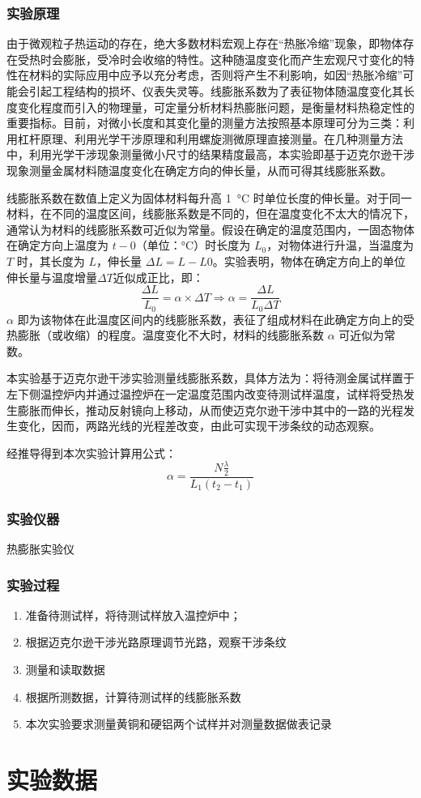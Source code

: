 \documentclass[a4paper,utf8]{article}
\begin{document}
\section{实验原理}%
    由于微观粒子热运动的存在，绝大多数材料宏观上存在“热胀冷缩”现象，即物体存在受热时会膨胀，受冷时会收缩的特性。这种随温度变化而产生宏观尺寸变化的特性在材料的实际应用中应予以充分考虑，否则将产生不利影响，如因“热胀冷缩”可能会引起工程结构的损坏、仪表失灵等。线膨胀系数为了表征物体随温度变化其长度变化程度而引入的物理量，可定量分析材料热膨胀问题，是衡量材料热稳定性的重要指标。目前，对微小长度和其变化量的测量方法按照基本原理可分为三类：利用杠杆原理、利用光学干涉原理和利用螺旋测微原理直接测量。在几种测量方法中，利用光学干涉现象测量微小尺寸的结果精度最高，本实验即基于迈克尔逊干涉现象测量金属材料随温度变化在确定方向的伸长量，从而可得其线膨胀系数。\par
    线膨胀系数在数值上定义为固体材料每升高 \SI{1}{\degreeCelsius} 时单位长度的伸长量。对于同一材料，在不同的温度区间，线膨胀系数是不同的，但在温度变化不太大的情况下，通常认为材料的线膨胀系数可近似为常量。假设在确定的温度范围内，一固态物体在确定方向上温度为 $t-0$（单位：\unit{\degreeCelsius}）时长度为 $L_0$，对物体进行升温，当温度为 $T$ 时，其长度为 $L$，伸长量 $\varDelta L=L-L0$。实验表明，物体在确定方向上的单位伸长量与温度增量$\varDelta T$近似成正比，即：
    \begin{equation}
        \frac{\varDelta L}{L_0} = \alpha \times \varDelta T \Longrightarrow  \alpha=\frac{\varDelta L}{L_0 \varDelta T}
    \end{equation}
    $\alpha$ 即为该物体在此温度区间内的线膨胀系数，表征了组成材料在此确定方向上的受热膨胀（或收缩）的程度。温度变化不大时，材料的线膨胀系数 $\alpha$ 可近似为常数。\par
    本实验基于迈克尔逊干涉实验测量线膨胀系数，具体方法为：将待测金属试样置于左下侧温控炉内并通过温控炉在一定温度范围内改变待测试样温度，试样将受热发生膨胀而伸长，推动反射镜向上移动，从而使迈克尔逊干涉中其中的一路的光程发生变化，因而，两路光线的光程差改变，由此可实现干涉条纹的动态观察。\par
    经推导得到本次实验计算用公式：
    \begin{equation}
        \alpha=\frac{N\frac\lambda2}{L_1(t_2-t_1)}
    \end{equation}
\section{实验仪器}%
    热膨胀实验仪
\section{实验过程}%
    \begin{enumerate}
        \item 准备待测试样，将待测试样放入温控炉中；
        \item 根据迈克尔逊干涉光路原理调节光路，观察干涉条纹
        \item 测量和读取数据
        \item 根据所测数据，计算待测试样的线膨胀系数
        \item 本次实验要求测量黄铜和硬铝两个试样并对测量数据做表记录         
    \end{enumerate}
\part{实验数据}
\end{document}

